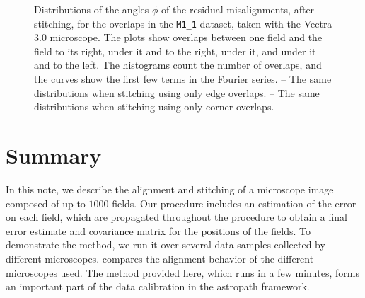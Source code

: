 \documentclass{article}
\newcommand{\M}[2]{\texttt{M#1\_#2}}
\begin{document}
\begin{figure}[ht]
\begin{subfigure}{0.24\linewidth}
		\caption{}
		\label{fig:isotropyhistvectra1corners}
	\end{subfigure}
	\caption{Distributions of the angles $\phi$ of the residual misalignments, after stitching, for the overlaps in the \M11 dataset, taken with the Vectra 3.0 microscope.  The plots show overlaps between one field and the field  to its right,  under it and to the right,  under it, and  under it and to the left.  The histograms count the number of overlaps, and the curves show the first few terms in the Fourier series.  -- The same distributions when stitching using only edge overlaps.  -- The same distributions when stitching using only corner overlaps.}
	\label{fig:stitchfourierseries}
\end{figure}

\section{Summary}

In this note, we describe the alignment and stitching of a microscope image composed of up to $1000$ fields.  Our procedure includes an estimation of the error on each field, which are propagated throughout the procedure to obtain a final error estimate and covariance matrix for the positions of the fields.  To demonstrate the method, we run it over several data samples collected by different microscopes.   compares the alignment behavior of the different microscopes used.  The method provided here, which runs in a few minutes, forms an important part of the data calibration in the astropath framework.
\end{document}
